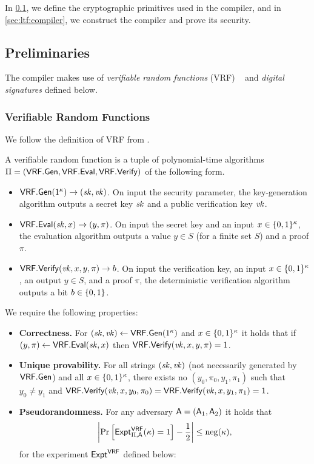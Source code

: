 In \cref{sec:ltf:prelim}, we define the cryptographic primitives used in the compiler, and in \cref{sec:ltf:compiler}, we construct the compiler and prove its security.

\subsection{Preliminaries}\label{sec:ltf:prelim}
The compiler makes use of  \emph{verifiable random functions} (VRF) ~\cite{MRV99} and \emph{digital signatures}   defined below.

\subsubsection{Verifiable Random Functions}
We follow the definition of VRF from \cite{HJ16}.
\begin{definition}[VRF]\label{def:vrf}
A \textsf{verifiable random function} is a tuple of polynomial-time algorithms $\Pi=(\mathsf{VRF.Gen},\mathsf{VRF.Eval},\mathsf{VRF.Verify})$ of the following form.
\begin{itemize}
    \item
    $\mathsf{VRF.Gen}(1^\kappa)\to(\mathit{sk},\mathit{vk})$. On input the security parameter, the key-generation algorithm outputs a secret key $\mathit{sk}$ and a public verification key $\mathit{vk}$.
    \item
    $\mathsf{VRF.Eval}(\mathit{sk},x)\to(y,\pi)$. On input the secret key and an input $x\in\{0,1\}^\kappa$, the evaluation algorithm outputs a value $y\in S$ (for a finite set $S$)  and a proof $\pi$.
    \item
    $\mathsf{VRF.Verify}(\mathit{vk},x,y,\pi)\to b$. On input the verification key, an input $x\in\{0,1\}^\kappa$, an output $y\in S$, and a proof $\pi$, the deterministic verification algorithm outputs a bit $b\in\{0,1\}$.
\end{itemize}
\end{definition}
\noindent
We require the following properties:
\begin{itemize}

\item \textbf{Correctness.}
For $(\mathit{sk},\mathit{vk})\gets\mathsf{VRF.Gen}(1^\kappa)$ and $x\in\{0,1\}^\kappa$ it holds that if $(y,\pi)\gets\mathsf{VRF.Eval}(\mathit{sk},x)$ then $\mathsf{VRF.Verify}(\mathit{vk},x,y,\pi)=1$.

\item \textbf{Unique provability.}
For all strings $(\mathit{sk}, \mathit{vk})$ (not necessarily generated by $\mathsf{VRF.Gen}$) and all $x\in\{0,1\}^\kappa$, there  exists no $(y_0,\pi_0,y_1,\pi_1)$ such that $y_0\neq y_1$ and $\mathsf{VRF.Verify}(\mathit{vk},x,y_0,\pi_0)=\mathsf{VRF.Verify}(\mathit{vk},x,y_1,\pi_1)=1$.

\item \textbf{Pseudorandomness.}
For any \ppt adversary $\mathsf{A}=(\mathsf{A}_1,\mathsf{A}_2)$ it holds that
\[
\left|\Pr_{}\left[\mathsf{Expt}^\mathsf{VRF}_{\Pi,\mathsf{A}}(\kappa)=1\right]-\frac12\right|\leq \operatorname{neg}(\kappa),
\]
\noindent
for the experiment $\mathsf{Expt}^\mathsf{VRF}$ defined below:
\end{itemize}


